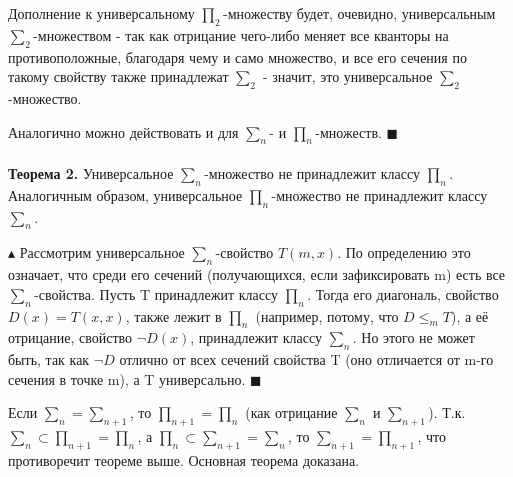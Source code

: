 Дополнение к универсальному $\prod_2$-множеству будет, очевидно, универсальным $\sum_2$-множеством - так как отрицание чего-либо меняет все кванторы на противоположные, благодаря чему и само множество, и все его сечения по такому свойству также принадлежат $\sum_2$ - значит, это универсальное $\sum_2$-множество.

Аналогично можно действовать и для $\sum_n$- и $\prod_n$-множеств.
$\blacksquare$ \\
\\
\textbf{Теорема 2.} Универсальное $\sum_n$-множество не принадлежит классу $\prod_n$. Аналогичным образом, универсальное $\prod_n$-множество не принадлежит классу $\sum_n$.

$\blacktriangle$
Рассмотрим универсальное $\sum_n$-свойство $T(m, x)$. По определению это означает, что среди его сечений (получающихся, если зафиксировать m) есть все $\sum_n$-свойства. Пусть T принадлежит классу $\prod_n$. Тогда его диагональ, свойство $D(x) = T(x, x)$, также лежит в $\prod_n$ (например, потому, что $D \leqslant_m T$), а её отрицание, свойство $\neg D(x)$, принадлежит классу $\sum_n$. Но этого не может быть, так как $\neg D$ отлично от всех сечений свойства T (оно отличается от m-го сечения в точке m), а T универсально.
$\blacksquare$

Если $\sum_n = \sum_{n+1}$, то $\prod_{n+1} = \prod_n$ (как отрицание $\sum_n$ и $\sum_{n+1}$). Т.к. $\sum_n \subset \prod_{n+1} = \prod_n$, а $\prod_n \subset \sum_{n+1} = \sum_n$, то $\sum_{n+1} = \prod_{n+1}$, что противоречит теореме выше. Основная теорема доказана. 